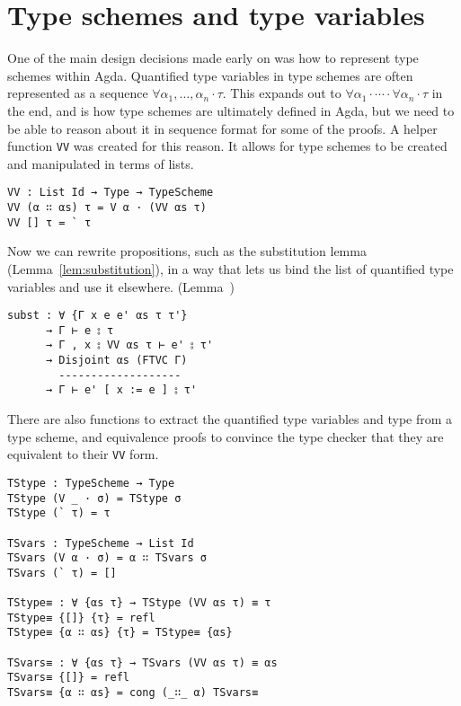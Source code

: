 \section{Type schemes and type variables}
One of the main design decisions made early on was how to represent
type schemes within Agda. Quantified type variables in type schemes are often
represented as a sequence
$\forall \alpha_1,\ldots,\alpha_n \cdot \tau$. This expands out to
$\forall \alpha_1 \cdot \cdots \cdot \forall \alpha_n \cdot \tau$ in the end, and is how type schemes are
ultimately defined in Agda, but we need to be able to reason about it
in sequence format for some of the proofs. A helper function
\texttt{VV} was created for this reason. It allows for type schemes
to be created and manipulated in terms of lists.
\begin{verbatim}
VV : List Id → Type → TypeScheme
VV (α ∷ αs) τ = V α · (VV αs τ)
VV [] τ = ` τ
\end{verbatim}
Now we can rewrite propositions, such as the substitution lemma
(Lemma~\ref{lem:substitution}), in a way that lets us bind the list
of quantified type variables and use it elsewhere.
(Lemma~)
\begin{verbatim}
subst : ∀ {Γ x e e' αs τ τ'}
      → Γ ⊢ e ⦂ τ
      → Γ , x ⦂ VV αs τ ⊢ e' ⦂ τ'
      → Disjoint αs (FTVC Γ)
        -------------------
      → Γ ⊢ e' [ x := e ] ⦂ τ'
\end{verbatim}
There are also functions to extract the quantified type variables and
type from a type scheme, and equivalence proofs to convince the
type checker that they are equivalent to their \texttt{VV} form.
\begin{verbatim}
TStype : TypeScheme → Type
TStype (V _ · σ) = TStype σ
TStype (` τ) = τ

TSvars : TypeScheme → List Id
TSvars (V α · σ) = α ∷ TSvars σ
TSvars (` τ) = []

TStype≡ : ∀ {αs τ} → TStype (VV αs τ) ≡ τ
TStype≡ {[]} {τ} = refl
TStype≡ {α ∷ αs} {τ} = TStype≡ {αs}

TSvars≡ : ∀ {αs τ} → TSvars (VV αs τ) ≡ αs
TSvars≡ {[]} = refl
TSvars≡ {α ∷ αs} = cong (_∷_ α) TSvars≡
\end{verbatim}